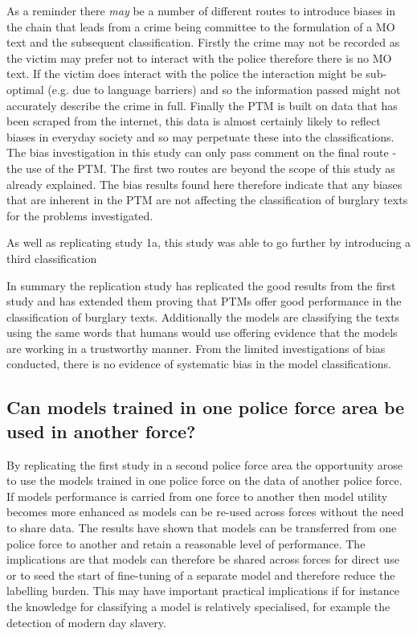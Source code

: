 As a reminder there \emph{may} be a number of different routes to introduce biases in the chain that leads from a crime being committee to the formulation of a MO text and the subsequent classification. Firstly the crime may not be recorded as the victim may prefer not to interact with the police therefore there is no MO text. If the victim does interact with the police the interaction might be sub-optimal (e.g. due to language barriers) and so the information passed might not accurately describe the crime in full. Finally the PTM is built on data that has been scraped from the internet, this data is almost certainly likely to reflect biases in everyday society and so may perpetuate these into the classifications. The bias investigation in this study can only pass comment on the final route - the use of the PTM. The first two routes are beyond the scope of this study as already explained. The bias results found here therefore indicate that any biases that are inherent in the PTM are not affecting the classification of burglary texts for the problems investigated. 

As well as replicating study 1a, this study was able to go further by introducing a third classification

In summary the replication study has replicated the good results from the first study and has extended them proving that PTMs offer good performance in the classification of burglary texts. Additionally the models are classifying the texts using the same words that humans would use offering evidence that the models are working in a trustworthy manner. From the limited investigations of bias conducted, there is no evidence of systematic bias in the model classifications.


\subsection{Can models trained in one police force area be used in another force?} By replicating the first study in a second police force area the opportunity arose to use the models trained in one police force on the data of another police force. If models performance is carried from one force to another then model utility becomes more enhanced as models can be re-used across forces without the need to share data. The results have shown that models can be transferred from one police force to another and retain a reasonable level of performance. The implications are that models can therefore be shared across forces for direct use or to seed the start of fine-tuning of a separate model and therefore reduce the labelling burden. This may have important practical implications if for instance the knowledge for classifying a model is relatively specialised, for example the detection of modern day slavery. 

